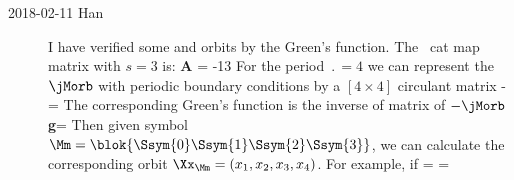 \begin{description}
	\item[2018-02-11 Han]{
I have verified some {\admissible} and {\inadmissible} orbits by the Green's
function. The \PV\ cat map matrix with $s=3$ is:
\beq
{\bf A}
=
          {-1}{3}
For the period $\period{}=4$ we can represent the
{\jacobianOrb} $\jMorb$ %
with periodic boundary conditions by a $[4\times 4]$ circulant matrix
\beq
-\jMorb=
The corresponding Green's function is the inverse of matrix of {\jacobianOrb} $-\jMorb$
\beq
{\bf g}=
Then given symbol \brick\ $\Mm = \blok{\Ssym{0} \Ssym{1} \Ssym{2} \Ssym{3}}$,
we can calculate the corresponding orbit $\Xx_\Mm = (x_1,x_2,x_3,x_4)$.
For example, if
\beq
\Mm=
\left[
\begin{array}{c}
 0 \\
 2 \\
 2 \\
 0 \\
\end{array}
\right]
            \qquad\Rightarrow\qquad
\Xx =  
\left[\begin{array}{c}
 {2} \\
 {4} \\
 {4} \\
 {2} \\
\end{array}\right]
}
\end{description}
